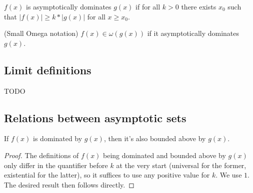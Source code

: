 \begin{definition}
    \label{def:asymp_dominates}
    \leanok
    $f(x)$ is asymptotically dominates $g(x)$ if for all $k > 0$ there exists $x_0$ 
    such that $|f(x)| \ge k*|g(x)|$ for all $x \ge x_0$.
\end{definition}

\begin{definition}(Small Omega notation)
    \label{def:small_omega}
    \leanok
    $f(x) \in \omega(g(x))$ if it asymptotically dominates $g(x)$.
\end{definition}


\subsection{Limit definitions}

TODO

\subsection{Relations between asymptotic sets}

\begin{lemma}
    \label{lemma:asymp_dominated_imp_bounded_above}
    \leanok
    If $f(x)$ is dominated by $g(x)$, then it's also bounded above by $g(x)$.
\end{lemma}

\begin{proof}
    \leanok 
    The definitions of $f(x)$ being dominated and bounded above by $g(x)$ only differ
    in the quantifier before $k$ at the very start (universal for the former, existential
    for the latter), so it suffices to use any positive value for $k$. We use $1$. 
    The desired result then follows directly.
\end{proof}


